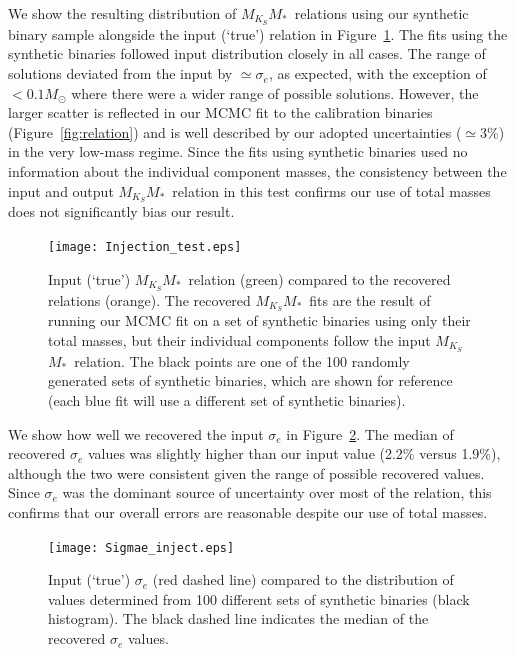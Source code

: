 \documentclass[twocolumn]{aastex62}
\newcommand{\mmk}{$M_{K_S}$\textendash$M_*$}
\begin{document}
We show the resulting distribution of \mmk\ relations using our synthetic binary sample alongside the input (`true') relation in Figure~\ref{fig:inject}. The fits using the synthetic binaries followed input distribution closely in all cases. The range of solutions deviated from the input by $\simeq\sigma_e$, as expected, with the exception of $<0.1M_\odot$ where there were a wider range of possible solutions. However, the larger scatter is reflected in our MCMC fit to the calibration binaries (Figure~\ref{fig:relation}) and is well described by our adopted uncertainties ($\simeq3\%$) in the very low-mass regime. Since the fits using synthetic binaries used no information about the individual component masses, the consistency between the input and output \mmk\ relation in this test confirms our use of total masses does not significantly bias our result.

\begin{figure}[h]
\begin{center}
\texttt{[image: Injection\_test.eps]}
\caption{Input (`true') \mmk\ relation (green) compared to the recovered relations (orange). The recovered \mmk\ fits are the result of running our MCMC fit on a set of synthetic binaries using only their total masses, but their individual components follow the input \mmk\ relation. The black points are one of the 100 randomly generated sets of synthetic binaries, which are shown for reference (each blue fit will use a different set of synthetic binaries). }
\label{fig:inject}
\end{center}
\end{figure}

We show how well we recovered the input $\sigma_e$ in Figure~\ref{fig:sigetest}. The median of recovered $\sigma_e$ values was slightly higher than our input value (2.2\% versus 1.9\%), although the two were consistent given the range of possible recovered values. Since $\sigma_e$ was the dominant source of uncertainty over most of the relation, this confirms that our overall errors are reasonable despite our use of total masses. 

\begin{figure}[h]
\begin{center}
\texttt{[image: Sigmae\_inject.eps]}
\caption{Input (`true') $\sigma_e$ (red dashed line) compared to the distribution of values determined from 100 different sets of synthetic binaries (black histogram). The black dashed line indicates the median of the recovered $\sigma_e$ values. }
\label{fig:sigetest}
\end{center}
\end{figure}
\end{document}
